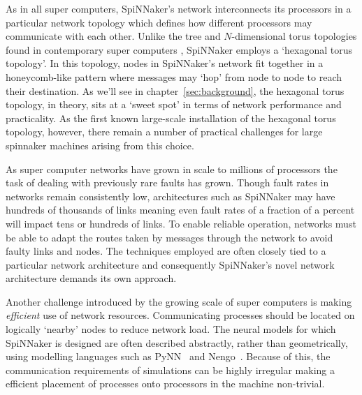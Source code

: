 As in all super computers, SpiNNaker's network interconnects its processors in
a particular network topology which defines how different processors may
communicate with each other. Unlike the tree and $N$-dimensional torus
topologies found in contemporary super computers \cite{dally04}, SpiNNaker
employs a `hexagonal torus topology'. In this topology, nodes in SpiNNaker's
network fit together in a honeycomb-like pattern where messages may `hop' from
node to node to reach their destination. As we'll see in
chapter~\ref{sec:background}, the hexagonal torus topology, in theory, sits at
a `sweet spot' in terms of network performance and practicality. As the first
known large-scale installation of the hexagonal torus topology, however, there
remain a number of practical challenges for large spinnaker machines arising
from this choice.

As super computer networks have grown in scale to millions of processors the
task of dealing with previously rare faults has grown.  Though fault rates in
networks remain consistently low, architectures such as SpiNNaker may have
hundreds of thousands of links meaning even fault rates of a fraction of a
percent will impact tens or hundreds of links. To enable reliable operation,
networks must be able to adapt the routes taken by messages through the network
to avoid faulty links and nodes. The techniques employed are often closely tied
to a particular network architecture and consequently SpiNNaker's novel network
architecture demands its own approach.

Another challenge introduced by the growing scale of super computers is making
\emph{efficient} use of network resources. Communicating processes should be
located on logically `nearby' nodes to reduce network load. The neural models
for which SpiNNaker is designed are often described abstractly, rather than
geometrically, using modelling languages such as PyNN~\cite{davison08} and
Nengo~\cite{eliasmith04}.  Because of this, the communication requirements of
simulations can be highly irregular making a efficient placement of processes
onto processors in the machine non-trivial.

%

